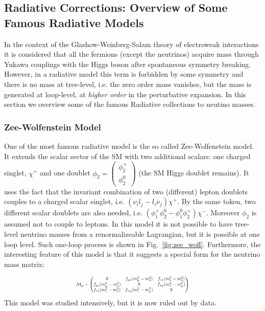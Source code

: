 \subsection{Radiative Corrections: Overview of Some Famous Radiative Models}

In the context of the Glashow-Weinberg-Salam theory of electroweak interactions it is considered that all the fermions (except the neutrinos) acquire mass through Yukawa couplings with the Higgs boson after spontaneous symmetry breaking. However, in a radiative model this term is forbidden by some symmetry and there is no mass at tree-level, i.e. the zero order mass vanishes, but the mass is generated at loop-level, at \textit{higher order} in the perturbative expansion. In this section we overview some of the famous Radiative collections to neutino masses. 

\subsubsection{Zee-Wolfenstein Model}
One of the most famous radiative model is the so called Zee-Wolfenstein model\cite{zee_wolfstein}. It extends the scalar sector of the SM with two additional scalars: one charged singlet, \(\chi^+\) and one doublet \(\phi_2 = \begin{pmatrix}
    \phi ^+ _2 \\ \phi _2 ^0
\end{pmatrix}\) (the SM Higgs doublet remains). It uses the fact that the  invariant combination of two (different) lepton doublets couples to a  charged scalar singlet, i.e. $(\nu_i l_j - l_i \nu_j) \chi^+$.  By the same  token, two different scalar doublets are also needed, i.e. $(\phi_1^+ \phi_2^0 - \phi_1^0 \phi_2^+) \chi^-$. Moreover \(\phi_2\) is assumed not to couple to leptons. In this model it is not possible to have tree-level neutrino masses from a renormalizeable Lagrangian, but it is possible at one loop level. Such one-loop process is shown in Fig.~\ref{fig:zee_wofl}. Furthermore, the interesting feature of this model is that it suggests a special form for the neutrino mass matrix:

\begin{equation}
\resizebox{0.46\textwidth}{!}{${\cal M}_\mu = \begin{pmatrix}0 & f_{\mu e} (m_\mu^2 - m_e^2) & f_{\tau e} 
(m_\tau^2 - m_e^2) \\  f_{\mu e} (m_\mu^2 - m_e^2) & 0 & f_{\tau \mu} (m_\tau^2 
- m_\mu^2) \\  f_{\tau e} (m_\tau^2 - m_e^2) & f_{\tau \mu} (m_\tau^2 - m_\mu^2) 
& 0 \end{pmatrix}$}
\end{equation}
This model was studied intensively, but it is now ruled out by data\cite{He:2003ih}.

